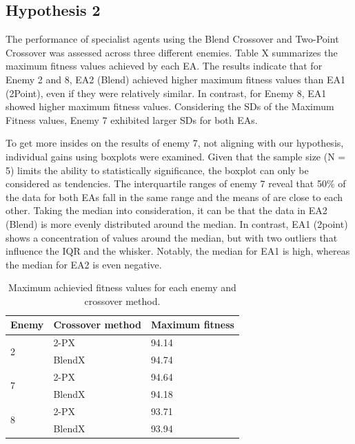 \subsection{Hypothesis 2}
The performance of specialist agents using the Blend Crossover and Two-Point Crossover was assessed across three different enemies.
Table X summarizes the maximum fitness values achieved by each EA.
The results indicate that for Enemy 2 and 8, EA2 (Blend) achieved higher maximum fitness values than EA1 (2Point), even if they were relatively similar.
In contrast, for Enemy 8, EA1 showed higher maximum fitness values.
Considering the SDs of the Maximum Fitness values, Enemy 7 exhibited larger SDs for both EAs.

To get more insides on the results of enemy 7, not aligning with our hypothesis, individual gains using boxplots were examined.
Given that the sample size (N = 5) limits the ability to statistically significance, the boxplot can only be considered as tendencies.
The interquartile ranges of enemy 7 reveal that 50\% of the data for both EAs fall in the same range and the means of are close to each other.
Taking the median into consideration, it can be that the data in EA2 (Blend) is more evenly distributed around the median.
In contrast, EA1 (2point) shows a concentration of values around the median, but with two outliers that influence the IQR and the whisker.
Notably, the median for EA1 is high, whereas the median for EA2 is even negative.

\begin{table}[tbp]
    \begin{tabular}{|l|l|l|}
    \hline
    Enemy              & Crossover method & Maximum fitness \\ \hline
    \multirow{2}{*}{2} & 2-PX             & 94.14           \\ \cline{2-3}
                       & BlendX           & 94.74           \\ \hline
    \multirow{2}{*}{7} & 2-PX             & 94.64           \\ \cline{2-3}
                       & BlendX           & 94.18           \\ \hline
    \multirow{2}{*}{8} & 2-PX             & 93.71           \\ \cline{2-3}
                       & BlendX           & 93.94           \\ \hline
    \end{tabular}
\caption{Maximum achievied fitness values for each enemy and crossover method.}
\end{table}

